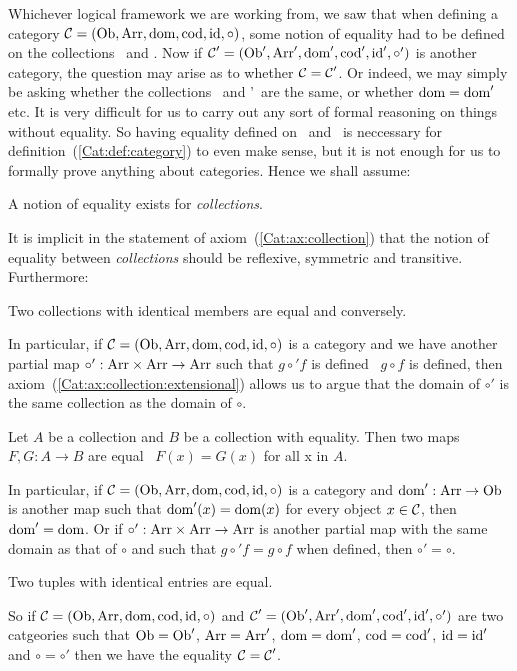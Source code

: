 Whichever logical framework we are working from, we saw that when defining
a category $\mbox{$\cal C$}=(\mbox{\rm Ob}, \mbox{\rm Arr}, \mbox{\rm dom}, \mbox{\rm cod}, \mbox{\rm id}, \circ)$, some notion of
equality had to be defined on the collections \ob\ and \arr. Now if
$\mbox{$\cal C$}'=(\mbox{\rm Ob}', \mbox{\rm Arr}', \mbox{\rm dom}', \mbox{\rm cod}', \mbox{\rm id}', \circ')$ is another category,
the question may arise as to whether $\mbox{$\cal C$}=\mbox{$\cal C$}'$. Or indeed, we may 
simply be asking whether the collections \ob\ and \ob'\ are the same,
or whether $\mbox{\rm dom}=\mbox{\rm dom}'$ etc. It is very difficult for us to carry out
any sort of formal reasoning on things without equality. So having
equality defined on \ob\ and \arr\ is neccessary for
definition~(\ref{Cat:def:category}) to even make sense, but it is not
enough for us to formally prove anything about categories. Hence we shall
assume:

\begin{axiom}\label{Cat:ax:collection}
    A notion of equality exists for {\em collections}.
\end{axiom}

\noindent
It is implicit in the statement of axiom~(\ref{Cat:ax:collection})
that the notion of equality between {\em collections} should 
be reflexive, symmetric and transitive. Furthermore:

\begin{axiom}\label{Cat:ax:collection:extensional}
    Two collections with identical members are equal and conversely.
\end{axiom}
In particular, if $\mbox{$\cal C$}=(\mbox{\rm Ob}, \mbox{\rm Arr}, \mbox{\rm dom}, \mbox{\rm cod}, \mbox{\rm id}, \circ)$ is
a category and we have another partial map $\circ':\mbox{\rm Arr}\times\mbox{\rm Arr}\to\mbox{\rm Arr}$ 
such that $g\circ' f$ is defined \ifand\ $g\circ f$ is defined,
then axiom~(\ref{Cat:ax:collection:extensional}) allows us to argue 
that the domain of $\circ'$ is the same collection as the domain
of $\circ$.

\begin{axiom}\label{Cat:ax:map:extensional}
    Let $A$ be a collection and $B$ be a collection with equality.
    Then two maps $F,G:A\to B$ are equal \ifand\ $F(x)=G(x)$ for all x in $A$.
\end{axiom}
In particular, if $\mbox{$\cal C$}=(\mbox{\rm Ob}, \mbox{\rm Arr}, \mbox{\rm dom}, \mbox{\rm cod}, \mbox{\rm id}, \circ)$ is a 
category and $\mbox{\rm dom}':\mbox{\rm Arr}\to\mbox{\rm Ob}$ is another map such that $\mbox{\rm dom}'(x)=\mbox{\rm dom}(x)$
for every object $x\in\mbox{$\cal C$}$, then $\mbox{\rm dom}'=\mbox{\rm dom}$. Or if $\circ':\mbox{\rm Arr}\times\mbox{\rm Arr}\to\mbox{\rm Arr}$ 
is another partial map  with the same domain as that of $\circ$ and such that 
$g\circ' f = g\circ f$ when defined, then $\circ'=\circ$.

\begin{axiom}\label{Cat:ax:tuple:extensional}
    Two tuples with identical entries are equal.
\end{axiom}
So if $\mbox{$\cal C$}=(\mbox{\rm Ob}, \mbox{\rm Arr}, \mbox{\rm dom}, \mbox{\rm cod}, \mbox{\rm id}, \circ)$ and
$\mbox{$\cal C$}'=(\mbox{\rm Ob}', \mbox{\rm Arr}', \mbox{\rm dom}', \mbox{\rm cod}', \mbox{\rm id}', \circ')$ are two catgeories
such that $\mbox{\rm Ob}=\mbox{\rm Ob}'$, $\mbox{\rm Arr}=\mbox{\rm Arr}'$, $\mbox{\rm dom}=\mbox{\rm dom}'$, $\mbox{\rm cod}=\mbox{\rm cod}'$,
$\mbox{\rm id}=\mbox{\rm id}'$ and $\circ=\circ'$ then we have the equality $\mbox{$\cal C$}=\mbox{$\cal C$}'$.

